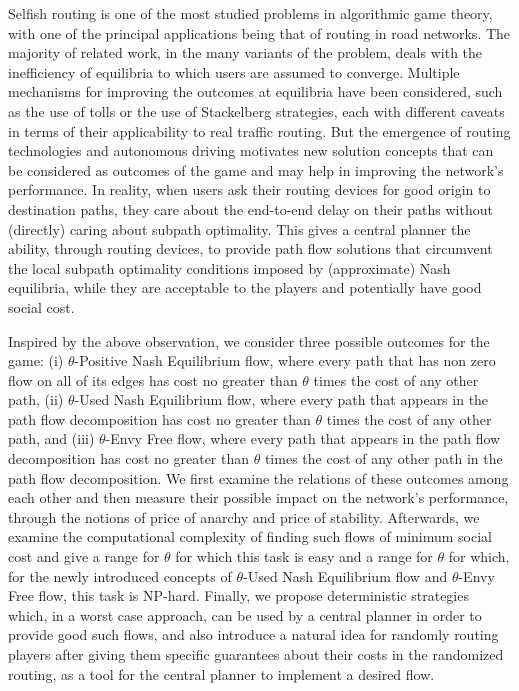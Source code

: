 Selfish routing is one of the %
most studied problems in algorithmic game theory, with one of the principal applications being that of routing in road networks. The majority of related work, in the many variants of the problem,  deals with the inefficiency of equilibria to which users are assumed to converge.
Multiple mechanisms for improving the outcomes at equilibria have been considered, such as the use of tolls or the use of Stackelberg strategies, each with different caveats in terms of their applicability to real traffic routing.  
But the emergence of routing technologies and autonomous driving motivates new solution concepts that can be considered as outcomes of the game and may help in improving the network's performance. In reality, when users ask their routing devices for good origin to destination paths, they care about the end-to-end delay on their paths without (directly) caring about subpath optimality. This gives a central planner the ability, through routing devices, to provide path flow solutions that circumvent the local subpath optimality conditions imposed by (approximate) Nash equilibria, while they are acceptable to the players and potentially have good social cost.
%

Inspired by the above observation, we consider three possible outcomes for the game: (i) $\theta$-Positive Nash Equilibrium flow,  where every path that has non zero flow on all of its edges has cost no greater than $\theta$ times the cost of any other path, (ii) $\theta$-Used Nash Equilibrium flow, where every path that appears in the path flow decomposition has cost no greater than $\theta$ times the cost of any other path, and (iii) $\theta$-Envy Free flow, where every path that appears in the path flow decomposition has cost no greater than $\theta$ times the cost of any other path in the path flow decomposition.
We first examine the relations of these outcomes among each other and then measure their possible impact on the network's performance, through the notions of price of anarchy and price of stability. Afterwards, we examine the computational complexity of finding such flows of minimum social cost and give a range for $\theta$ for which this task is easy and a range for $\theta$ for which, for the newly introduced concepts of $\theta$-Used Nash Equilibrium flow and $\theta$-Envy Free flow, this task is NP-hard. Finally, we propose deterministic strategies which, in a worst case approach,  can be used by a central planner in order to provide good such flows, and also introduce a natural idea for randomly routing players after giving them specific guarantees about their costs in the randomized routing, as a tool for the central planner to implement a desired flow.
  
